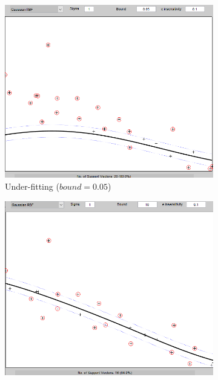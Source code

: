 \documentclass{article}
\begin{document}
        \begin{figure}[h]
             \centering
             \begin{subfigure}[b]{0.3\textwidth}
                 \centering
                 \includegraphics[width=\textwidth]{Assignment 2/figures/1_1/rbf_bound_small.png}
                 \caption{Under-fitting ($bound=0.05$)}
                 \label{fig:rbf_small_bound}
             \end{subfigure}
             \hfill
             \begin{subfigure}[b]{0.3\textwidth}
                 \centering
                 \includegraphics[width=\textwidth]{Assignment 2/figures/1_1/rbf_bound_medium.png}

\end{subfigure}
\end{figure}
\end{document}
